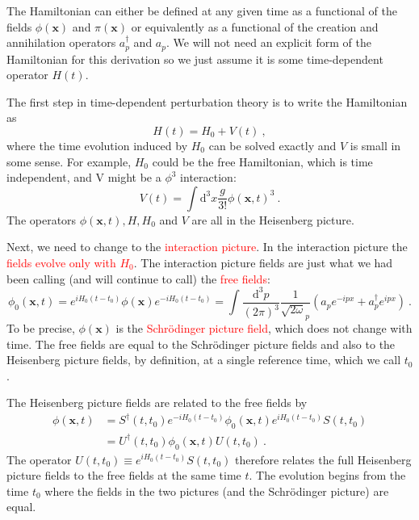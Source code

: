 \documentclass[11pt,a4paper]{article}
\renewcommand{\vec}[1]{\boldsymbol{#1}}
\newcommand{\dif}{\mathrm{d}}
\newcounter{theo}[section]\setcounter{theo}{0}
\begin{document}
The Hamiltonian can either be defined at any given time as a functional of the fields $\phi(\vec{x})$ and $\pi(\vec{x})$ or equivalently as a functional of the creation and annihilation operators $a^\dagger_p$ and $a_p$. We will not need an explicit form of the Hamiltonian for this derivation so we just assume it is some time-dependent operator $H(t)$.

The first step in time-dependent perturbation theory is to write the Hamiltonian as
\begin{equation}
H(t) = H_0 +V(t) ~,
\end{equation}
where the time evolution induced by $H_0$ can be solved exactly and $V$ is small in some sense. For example, $H_0$ could be the free Hamiltonian, which is time independent, and V might be a $\phi^3$ interaction:
\begin{equation}
V(t) = \int \dif^3 x \dfrac{g}{3!} \phi(\vec{x}, t)^3 ~.
\end{equation}
The operators $\phi(\vec{x}, t), H, H_0$ and $V$ are all in the Heisenberg picture.

Next, we need to change to the \textcolor{red}{interaction picture}. In the interaction picture the \textcolor{red}{fields evolve only with $H_0$}. The interaction picture fields are just what we had been calling (and will continue to call) the \textcolor{red}{free fields}:
\begin{equation}
\phi_0(\vec{x}, t) = e^{iH_0(t-t_0)} \phi(\vec{x}) e^{-iH_0(t-t_0)} = \int \dfrac{\dif^3 p}{(2\pi)^3} \dfrac{1}{\sqrt{2\omega}_p} (a_p e^{-ipx} + a^\dagger_p e^{ipx} ) ~.
\end{equation}
To be precise, $\phi(\vec{x})$ is the \textcolor{red}{Schr\"odinger picture field}, which does not change with time. The free fields are equal to the Schr\"odinger picture fields and also to the Heisenberg picture fields, by definition, at a single reference time, which we call $t_0$.

The Heisenberg picture fields are related to the free fields by
\begin{align}
\nonumber \phi(\vec{x}, t) &= S^\dagger(t, t_0) e^{-iH_0(t-t_0)} \phi_0(\vec{x}, t) e^{iH_0(t-t_0)} S(t, t_0) \\
&= U^\dagger(t, t_0) \phi_0(\vec{x}, t) U(t, t_0) ~.
\end{align}
The operator $U(t,t_0) \equiv e^{iH_0(t-t_0)} S(t,t_0)$ therefore relates the full Heisenberg picture fields to the free fields at the same time $t$. The evolution begins from the time $t_0$ where the fields in the two pictures (and the Schr\"odinger picture) are equal.
\end{document}
